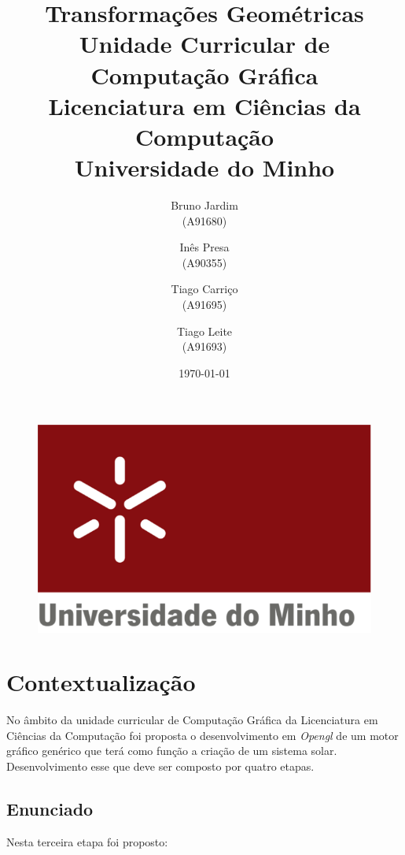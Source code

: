 \documentclass[11pt,a4paper]{report}
\begin{document}
\begin{figure}
    \includegraphics[scale=0.3]{logoum.png}
\end{figure}
\title{\textbf{Transformações Geométricas}\\
       \textbf{Unidade Curricular de Computação Gráfica}\\ Licenciatura em Ciências da Computação\\Universidade do Minho
       } %
\author{Bruno Jardim\\ (A91680) \and Inês Presa\\ (A90355)
         \and Tiago Carriço\\ (A91695) \and Tiago Leite\\ (A91693)
       } %
\date{\today} %
\maketitle
\begingroup
\renewcommand*\contentsname{Índice}
\let\clearpage\relax
\tableofcontents


\endgroup
\newpage

\chapter{Contextualização}    
No âmbito da unidade curricular de Computação Gráfica da Licenciatura em Ciências da Computação foi proposta o desenvolvimento em \textit{Opengl} de um motor gráfico genérico que terá como função a criação de um sistema solar. Desenvolvimento esse que deve ser composto por quatro etapas. 

\section{Enunciado}
Nesta terceira etapa foi proposto:
\end{document}
